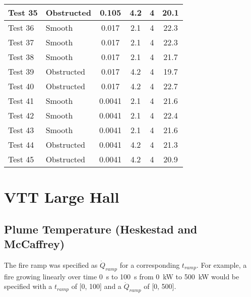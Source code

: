 \begin{table}[!ht]
\begin{center}
\begin {tabular}{|l|l|c|c|c|c|}
Test 35    &  Obstructed    &  0.105            &  4.2        &  4             &  20.1              \\ \hline
Test 36    &  Smooth        &  0.017            &  2.1        &  4             &  22.3              \\ \hline
Test 37    &  Smooth        &  0.017            &  2.1        &  4             &  22.3              \\ \hline
Test 38    &  Smooth        &  0.017            &  2.1        &  4             &  21.7              \\ \hline
Test 39    &  Obstructed    &  0.017            &  4.2        &  4             &  19.7              \\ \hline
Test 40    &  Obstructed    &  0.017            &  4.2        &  4             &  22.7              \\ \hline
Test 41    &  Smooth        &  0.0041           &  2.1        &  4             &  21.6              \\ \hline
Test 42    &  Smooth        &  0.0041           &  2.1        &  4             &  22.4              \\ \hline
Test 43    &  Smooth        &  0.0041           &  2.1        &  4             &  21.6              \\ \hline
Test 44    &  Obstructed    &  0.0041           &  4.2        &  4             &  21.3              \\ \hline
Test 45    &  Obstructed    &  0.0041           &  4.2        &  4             &  20.9              \\ \hline
\end{tabular}
\end{center}
\end{table}


\clearpage


\section{VTT Large Hall}

\subsection*{Plume Temperature (Heskestad and McCaffrey)}

The fire ramp was specified as $\dot Q_{ramp}$ for a corresponding $t_{ramp}$.
For example, a fire growing linearly over time 0~s to 100~s from 0~kW to 500~kW
would be specified with a $t_{ramp}$ of [0, 100] and a $\dot Q_{ramp}$ of [0, 500].

